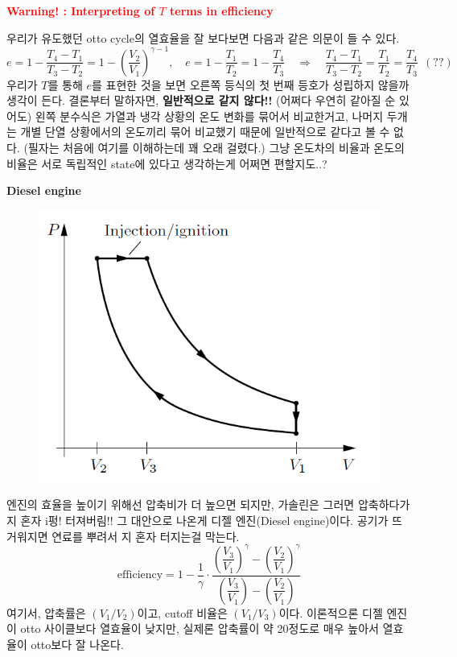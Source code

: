 \documentclass{article}
\begin{document}
\vspace{3mm}\noindent
\textcolor{red}{\textbf{Warning! : Interpreting of $T$ terms in efficiency}}

우리가 유도했던 otto cycle의 열효율을 잘 보다보면 다음과 같은 의문이 들 수 있다.
\begin{equation}
    e = 1- \frac{T_4 - T_1}{T_3 - T_2} = 1 - \left( \frac{V_2}{V_1} \right)^{\gamma -1}, \quad e = 1 - \frac{T_1}{T_2} = 1- \frac{T_4}{T_3} \quad \Rightarrow \quad \frac{T_4 - T_1}{T_3 - T_2} = \frac{T_1}{T_2} = \frac{T_4}{T_3} \ \ (??)
\end{equation}
우리가 $T$를 통해 $e$를 표현한 것을 보면 오른쪽 등식의 첫 번째 등호가 성립하지 않을까 생각이 든다. 결론부터 말하자면, \textbf{일반적으로 같지 않다!!} (어쩌다 우연히 같아질 순 있어도) 왼쪽 분수식은 가열과 냉각 상황의 온도 변화를 묶어서 비교한거고, 나머지 두개는 개별 단열 상황에서의 온도끼리 묶어 비교했기 때문에 일반적으로 같다고 볼 수 없다. (필자는 처음에 여기를 이해하는데 꽤 오래 걸렸다.) 그냥 온도차의 비율과 온도의 비율은 서로 독립적인 state에 있다고 생각하는게 어쩌면 편할지도..? 

\vspace{2mm}\noindent
\textbf{Diesel engine}

\begin{figure}[h]
    \centering
    \includegraphics[width=0.425\linewidth]{images/fig3_2.png}
\end{figure}

엔진의 효율을 높이기 위해선 압축비가 더 높으면 되지만, 가솔린은 그러면 압축하다가 지 혼자 i펑! 터져버림!! 그 대안으로 나온게 디젤 엔진(Diesel engine)이다. 공기가 뜨거워지면 연료를 뿌려서 지 혼자 터지는걸 막는다.
\begin{equation}
    \text{efficiency} = 1 - \dfrac{1}{\gamma} \cdot \dfrac{\left( \dfrac{V_3}{V_1} \right)^{\gamma} - \left( \dfrac{V_2}{V_1} \right)^{\gamma}}{\left( \dfrac{V_3}{V_1} \right) - \left( \dfrac{V_2}{V_1} \right)}
\end{equation}
여기서, 압축률은 $(V_1 / V_2)$이고, cutoff 비율은 $(V_1 / V_3)$이다. 이론적으론 디젤 엔진이 otto 사이클보다 열효율이 낮지만, 실제론 압축률이 약 20정도로 매우 높아서 열효율이 otto보다 잘 나온다.
\end{document}
